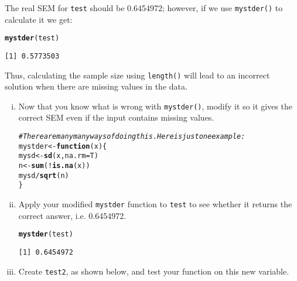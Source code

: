 \documentclass[12pt,a4paper]{article}\usepackage[]{graphicx}\usepackage[]{color}
\makeatletter
\newcommand{\hlcom}[1]{\textcolor[rgb]{0.678,0.584,0.686}{\textit{#1}}}%
\newcommand{\hlopt}[1]{\textcolor[rgb]{0,0,0}{#1}}%
\newcommand{\hlstd}[1]{\textcolor[rgb]{0.345,0.345,0.345}{#1}}%
\newcommand{\hlkwa}[1]{\textcolor[rgb]{0.161,0.373,0.58}{\textbf{#1}}}%
\newcommand{\hlkwb}[1]{\textcolor[rgb]{0.69,0.353,0.396}{#1}}%
\newcommand{\hlkwc}[1]{\textcolor[rgb]{0.333,0.667,0.333}{#1}}%
\newcommand{\hlkwd}[1]{\textcolor[rgb]{0.737,0.353,0.396}{\textbf{#1}}}%
\newenvironment{kframe}{%
 \def\at@end@of@kframe{}%
 \ifinner\ifhmode%
  \def\at@end@of@kframe{\end{minipage}}%
  \begin{minipage}{\columnwidth}%
 \fi\fi%
 \def\FrameCommand##1{\hskip\@totalleftmargin \hskip-\fboxsep
 \colorbox{shadecolor}{##1}\hskip-\fboxsep
     \hskip-\linewidth \hskip-\@totalleftmargin \hskip\columnwidth}%
 \MakeFramed {\advance\hsize-\width
   \@totalleftmargin\z@ \linewidth\hsize
   \@setminipage}}%
 {\par\unskip\endMakeFramed%
 \at@end@of@kframe}
\newenvironment{knitrout}{}{} %
\makeatother
\begin{document}
The real SEM for \texttt{test} should be 0.6454972; however, if we use \texttt{mystder()} to calculate it we get:
\begin{knitrout}
\color{fgcolor}\begin{kframe}
\begin{alltt}
\hlkwd{mystder}\hlstd{(test)}
\end{alltt}
\begin{verbatim}
[1] 0.5773503
\end{verbatim}
\end{kframe}
\end{knitrout}

Thus, calculating the sample size using \texttt{length()} will lead to an incorrect solution when there are missing values in the data. 
\begin{enumerate}[(i)] 
\item Now that you know what is wrong with \texttt{mystder()}, modify it so it gives the correct SEM even if the input contains missing values.  
\begin{knitrout}
\color{fgcolor}\begin{kframe}
\begin{alltt}
\hlcom{#There are many many ways of doing this. Here is just one example:}
\hlstd{mystder} \hlkwb{<-} \hlkwa{function}\hlstd{(}\hlkwc{x}\hlstd{)\{}
       \hlstd{mysd} \hlkwb{<-} \hlkwd{sd}\hlstd{(x,} \hlkwc{na.rm} \hlstd{= T)}
       \hlstd{n} \hlkwb{<-} \hlkwd{sum}\hlstd{(}\hlopt{!}\hlkwd{is.na}\hlstd{(x))}
       \hlstd{mysd}\hlopt{/}\hlkwd{sqrt}\hlstd{(n)}
\hlstd{\}}
\end{alltt}
\end{kframe}
\end{knitrout}
\item Apply your modified \texttt{mystder} function to \texttt{test} to see whether it returns the correct answer, i.e. 0.6454972.
\begin{knitrout}
\color{fgcolor}\begin{kframe}
\begin{alltt}
\hlkwd{mystder}\hlstd{(test)}
\end{alltt}
\begin{verbatim}
[1] 0.6454972
\end{verbatim}
\end{kframe}
\end{knitrout}
\item Create \texttt{test2}, as shown below, and test your function on this new variable.

\end{enumerate}
\end{document}
